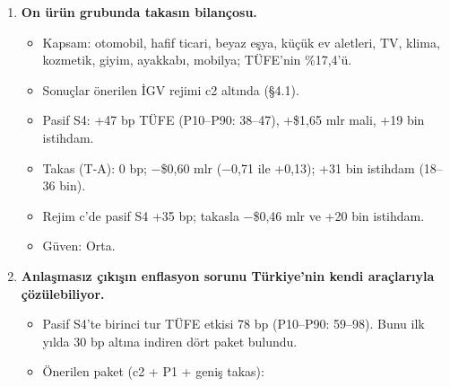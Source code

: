 \begin{enumerate}
  \begin{itemize}
  \tightlist
  \item
    Otomobil pazarının ancak \%22'si yerli. TÜFE'yi sabit tutmak için yerli otomobilde ÖTV'nin \%65'ten \%22,5'e inmesi gerekir. Bunun maliyeti yılda ≈\$3,0 mlr; on grupta ≈\$3,75 mlr. Takasta (T-A) maliyet ≈\$0,60 mlr.
  \item
    T-A'daki 8,8 puanlık indirim yalnızca yerliye uygulanırsa ucuz kalır, ama otomobilin TÜFE etkisinin ≈\%80'i yerinde durur.
  \item
    Yerli üreticiye doğrudan ödeme (T-B, III:8(b)) ekonomik olarak T-0 ile aynıdır. GATT md. III'e uygundur, ama Sübvansiyonlar ve Telafi Edici Önlemler Anlaşması (ASCM) kapsamında dava edilebilir.
  \item
    \etiketT{} Güven: Orta.
  \end{itemize}
\item
  \textbf{On ürün grubunda takasın bilançosu.}

  \begin{itemize}
  \tightlist
  \item
    Kapsam: otomobil, hafif ticari, beyaz eşya, küçük ev aletleri, TV, klima, kozmetik, giyim, ayakkabı, mobilya; TÜFE'nin \%17,4'ü.
  \item
    Sonuçlar önerilen İGV rejimi c2 altında (§4.1).
  \item
    Pasif S4: +47 bp TÜFE (P10--P90: 38--47), +\$1,65 mlr mali, +19 bin istihdam.
  \item
    Takas (T-A): 0 bp; −\$0,60 mlr (−0,71 ile +0,13); +31 bin istihdam (18--36 bin).
  \item
    Rejim c'de pasif S4 +35 bp; takasla −\$0,46 mlr ve +20 bin istihdam.
  \item
    \etiketT{} Güven: Orta.
  \end{itemize}
\item
  \textbf{Anlaşmasız çıkışın enflasyon sorunu Türkiye'nin kendi araçlarıyla çözülebiliyor.}

  \begin{itemize}
  \tightlist
  \item
    Pasif S4'te birinci tur TÜFE etkisi 78 bp (P10--P90: 59--98). Bunu ilk yılda 30 bp altına indiren dört paket bulundu.
  \item
    Önerilen paket (c2 + P1 + geniş takas):


\end{itemize}
\end{enumerate}
